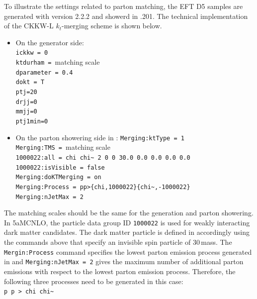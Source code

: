 To illustrate the settings related to parton matching, the EFT D5 samples are generated with \madgraphFiveaMCNLO version 2.2.2 and showerd in \pythiaEight.201. The technical implementation of the CKKW-L $k_t$-merging scheme is shown below.
\begin{itemize}
\item On the generator side:\\
\texttt{ickkw = 0} \\
\texttt{ktdurham = }matching scale \\
\texttt{dparameter = 0.4} \\
\texttt{dokt = T} \\
\texttt{ptj=20} \\
\texttt{drjj=0} \\
\texttt{mmjj=0} \\
\texttt{ptj1min=0} \\

\item On the parton showering side in \pythiaEight:
\texttt{Merging:ktType           = 1}\\
\texttt{Merging:TMS              = }matching scale\\
\texttt{1000022:all = chi chi\~{ } 2 0 0 30.0 0.0 0.0 0.0 0.0}\\
\texttt{1000022:isVisible = false}\\
\texttt{Merging:doKTMerging      = on}\\
\texttt{Merging:Process          = pp>\{chi,1000022\}\{chi\~{ },-1000022\}}\\
\texttt{Merging:nJetMax          = 2}\\
\end{itemize}
The matching scales should be the same for the generation and parton showering. In \madgraph5aMCNLO, the particle data group ID \texttt{1000022} is used for weakly interacting dark matter candidates. The dark matter particle is defined in \pythiaEight accordingly using the commands above that specify an invisible spin \textonehalf{} particle of 30\,\gev mass. The \texttt{Mergin:Process} command specifies the lowest parton emission process generated in \madgraph and \texttt{Merging:nJetMax = 2} gives the maximum number of additional parton emissions with respect to the lowest parton emission process. Therefore, the following three processes need to be generated in this case:\\

\texttt{p p > chi chi\~{ }}\\

